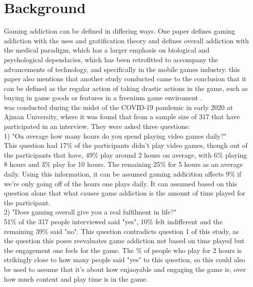 \documentclass[conference]{IEEEtran}
\begin{document}
\section{Background}
Gaming addiction can be defined in differing ways. One paper \cite{yasir2021} defines gaming addiction with the uses and gratification theory and defines overall addiction with the medical paradigm, which has a larger emphasis on biological and psychological dependacies, which has been retrofitted to accompany the advancements of technology, and specifically in the mobile games industry. this paper also mentions that another study conducted came to the conclusion that it can be defined as the regular action of taking drastic actions in the game, such as buying in game goods or features in a freenium game enviroment \cite{XWang2021}. \\

\cite{Naaj2021} was conducted during the midst of the COVID-19 pandemic in early 2020 at Ajman University, where it was found that from a sample size of 317 that have participated in an interview. They were asked three questions: \\

1) "On average how many hours do you spend playing video games daily?"\\
This question had 17\%  of the participants didn't play video games, though out of the participants that have, 49\% play around 2 hours on average, with 6\%  playing 8 hours and 3\% play for 10 hours. The remaining 25\%  for 5 hours as an average daily. Using this information, it can be assumed gaming addicition affects 9\% if we're only going off of the hours one plays daily. It can assumed based on this question alone that what causes game addiction is the amount of time played for the participant.\\

2) "Does gaming overall give you a real fulfilment in life?"\\
51\% of the 317 people interviewed said "yes", 10\% felt indifferent and the remaining 39\% said "no".  This question contradicts question 1 of this study, as the question this poses reevaluates game addiction not based on time played but the engagement one feels for the game. The \% of people who play for 2 hours is strikingly close to how many people said "yes" to this question, so this could also be used to assume that it's about how enjaoyable and engaging the game is, over how much content and play time is in the game.\\
\end{document}
